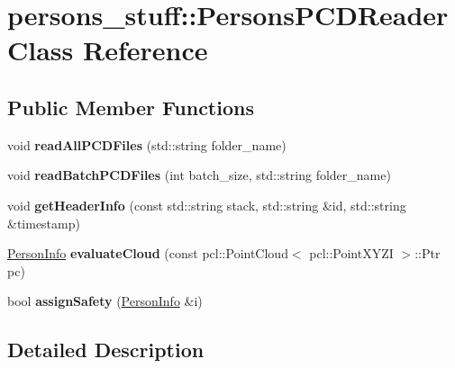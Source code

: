 \hypertarget{classpersons__stuff_1_1PersonsPCDReader}{}\section{persons\+\_\+stuff\+:\+:Persons\+P\+C\+D\+Reader Class Reference}
\label{classpersons__stuff_1_1PersonsPCDReader}
\subsection*{Public Member Functions}
\begin{DoxyCompactItemize}
\item 
\mbox{\label{classpersons__stuff_1_1PersonsPCDReader_a4ce56caf6447ec53a0edb362b2a88f51}} 
void {\bfseries read\+All\+P\+C\+D\+Files} (std\+::string folder\+\_\+name)
\item 
\mbox{\label{classpersons__stuff_1_1PersonsPCDReader_a0c34e9aaa9c864d88be1814941858826}} 
void {\bfseries read\+Batch\+P\+C\+D\+Files} (int batch\+\_\+size, std\+::string folder\+\_\+name)
\item 
\mbox{\label{classpersons__stuff_1_1PersonsPCDReader_a565b62f37e29d53dd75fb18fa4c4c7bc}} 
void {\bfseries get\+Header\+Info} (const std\+::string stack, std\+::string \&id, std\+::string \&timestamp)
\item 
\mbox{\label{classpersons__stuff_1_1PersonsPCDReader_a2a4154b25b8223a592e2b972154bcb40}} 
\hyperlink{structpersons__stuff_1_1PersonInfo}{Person\+Info} {\bfseries evaluate\+Cloud} (const pcl\+::\+Point\+Cloud$<$ pcl\+::\+Point\+X\+Y\+ZI $>$\+::Ptr pc)
\item 
\mbox{\label{classpersons__stuff_1_1PersonsPCDReader_a22e2780cc2cd860bfd3ea8656a45dc63}} 
bool {\bfseries assign\+Safety} (\hyperlink{structpersons__stuff_1_1PersonInfo}{Person\+Info} \&i)
\end{DoxyCompactItemize}


\subsection{Detailed Description}


